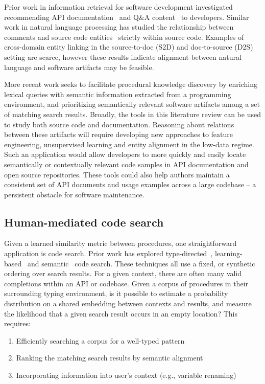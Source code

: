\documentclass[12pt]{article}
\begin{document}
Prior work in information retrieval for software development investigated recommending API documentation~\cite{robillard2015recommending} and Q\&A content~\cite{treude2016augmenting} to developers. Similar work in natural language processing has studied the relationship between comments and source code entities~\cite{iyer2018mapping, panthaplackel2020associating} strictly within source code. Examples of cross-domain entity linking in the source-to-doc (S2D) and doc-to-source (D2S) setting are scarce, however these results indicate alignment between natural language and software artifacts may be feasible.

More recent work seeks to facilitate procedural knowledge discovery by enriching lexical queries with semantic information extracted from a programming environment, and prioritizing semantically relevant software artifacts among a set of matching search results. Broadly, the tools in this literature review can be used to study both source code and documentation. Reasoning about relations between these artifacts will require developing new approaches to feature engineering, unsupervised learning and entity alignment in the low-data regime. Such an application would allow developers to more quickly and easily locate semantically or contextually relevant code samples in API documentation and open source repositories. These tools could also help authors maintain a consistent set of API documents and usage examples across a large codebase -- a persistent obstacle for software maintenance.

\subsection{Human-mediated code search}\label{subsec:code-search}

Given a learned similarity metric between procedures, one straightforward application is code search. Prior work has explored type-directed~\cite{james2020digging}, learning-based~\cite{gu2018deep} and semantic~\cite{premtoon2020semantic} code search. These techniques all use a fixed, or synthetic ordering over search results. For a given context, there are often many valid completions within an API or codebase. Given a corpus of procedures in their surrounding typing environment, is it possible to estimate a probability distribution on a shared embedding between contexts and results, and measure the likelihood that a given search result occurs in an empty location? This requires:

  \begin{enumerate}
    \item Efficiently searching a corpus for a well-typed pattern
    \item Ranking the matching search results by semantic alignment
    \item Incorporating information into user's context (e.g., variable renaming)
  \end{enumerate}
\end{document}
